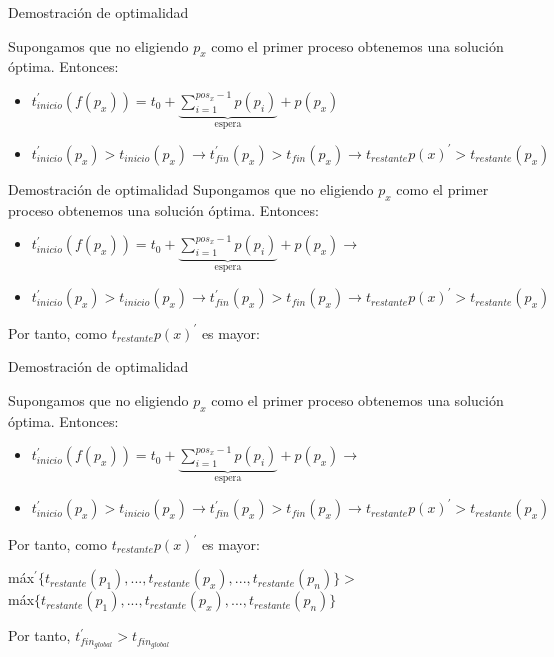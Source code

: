 \documentclass{beamer}
\begin{document}
\begin{frame}[fragile]{Demostración de optimalidad}

Supongamos que no eligiendo $p_x$ como el primer proceso obtenemos una solución óptima. Entonces:
\begin{itemize}
\item $t_{inicio}^{\prime}(f(p_x))= t_0 + 
\underbrace{\sum^{pos_x-1}_{i=1} p(p_i)}_{\text{espera}} + p(p_x) $

\item $t_{inicio}^{\prime}(p_x) > t_{inicio}(p_x) \rightarrow 
	t_{fin}^{\prime}(p_x) > t_{fin}(p_x) \rightarrow t_{restante}p(x)^{\prime} > t_{restante}(p_x)$
\end{itemize}

\end{frame}

\begin{frame}[fragile]{Demostración de optimalidad}
Supongamos que no eligiendo $p_x$ como el primer proceso obtenemos una solución óptima. Entonces:
\begin{itemize}
\item $t_{inicio}^{\prime}(f(p_x))= t_0 + 
\underbrace{\sum^{pos_x-1}_{i=1} p(p_i)}_{\text{espera}} + p(p_x) \rightarrow $

\item $t_{inicio}^{\prime}(p_x) > t_{inicio}(p_x) \rightarrow 
	t_{fin}^{\prime}(p_x) > t_{fin}(p_x) \rightarrow t_{restante}p(x)^{\prime} > t_{restante}(p_x)$
\end{itemize}

Por tanto, como $t_{restante}p(x)^{\prime}$ es mayor:
\end{frame}

\begin{frame}[fragile]{Demostración de optimalidad}

Supongamos que no eligiendo $p_x$ como el primer proceso obtenemos una solución óptima. Entonces:
\begin{itemize}
\item $t_{inicio}^{\prime}(f(p_x))= t_0 + 
\underbrace{\sum^{pos_x-1}_{i=1} p(p_i)}_{\text{espera}} + p(p_x) \rightarrow $

\item $t_{inicio}^{\prime}(p_x) > t_{inicio}(p_x) \rightarrow 
	t_{fin}^{\prime}(p_x) > t_{fin}(p_x) \rightarrow t_{restante}p(x)^{\prime} > t_{restante}(p_x)$
\end{itemize}

Por tanto, como $t_{restante}p(x)^{\prime}$ es mayor:
\begin{center}
máx$^{\prime}\{t_{restante}(p_1),...,t_{restante}(p_x),...,t_{restante}(p_n)\} > $ \\máx$\{t_{restante}(p_1),...,t_{restante}(p_x),...,t_{restante}(p_n)\}$
\end{center}
Por tanto, $t_{fin_{global}}^{\prime}> t_{fin_{global}}  $
\end{frame}
\end{document}

